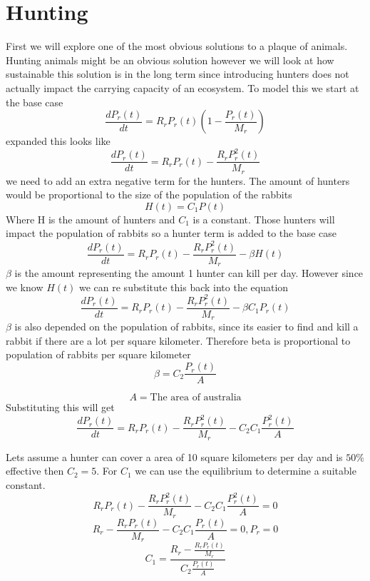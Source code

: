 \documentclass{article}
\begin{document}
\section{Hunting}
First we will explore one of the most obvious solutions to a plaque of animals. Hunting animals might be an obvious solution however we will look at how sustainable this solution is in the long term since introducing hunters does not actually impact the carrying capacity of an ecosystem. To model this we start at the base case 
$$
\frac{dP_r(t)}{dt} = R_rP_r(t)(1-\frac{P_r(t)}{M_r})
$$
expanded this looks like 
$$
\frac{dP_r(t)}{dt} = R_rP_r(t)-\frac{R_rP_r^2(t)}{M_r}
$$
we need to add an extra negative term for the hunters. The amount of hunters would be proportional to the size of the population of the rabbits
$$
H(t) = C_1 P(t)
$$
Where H is the amount of hunters and $C_1$ is a constant. Those hunters will impact the population of rabbits so a hunter term is added to the base case
$$
\frac{dP_r(t)}{dt} = R_rP_r(t)-\frac{R_rP_r^2(t)}{M_r} - \beta H(t)
$$
$\beta$ is the amount representing the amount 1 hunter can kill per day. However since we know $H(t)$ we can re substitute this back into the equation
$$
\frac{dP_r(t)}{dt} = R_rP_r(t)-\frac{R_rP_r^2(t)}{M_r} - \beta C_1 P_r(t)
$$
$\beta $ is also depended on the population of rabbits, since its easier to find and kill a rabbit if there are a lot per square kilometer. Therefore beta is proportional to population of rabbits per square kilometer
$$
\beta = C_2 \frac{P_r(t)}{A}
$$

$$A = \text{The area of australia}$$
Substituting this will get 
$$
\frac{dP_r(t)}{dt} = R_rP_r(t)-\frac{R_rP_r^2(t)}{M_r} - C_2 C_1 \frac{P_r^2(t)}{A}
$$

Lets assume a hunter can cover a area of 10 square kilometers per day and is $50\%$ effective then $C_2 = 5$. For  $C_1$ we can use the equilibrium to determine a suitable constant. 
$$R_rP_r(t)-\frac{R_rP_r^2(t)}{M_r} - C_2 C_1 \frac{P_r^2(t)}{A} = 0$$
$$ R_r-\frac{R_rP_r(t)}{M_r} - C_2 C_1 \frac{P_r(t)}{A} = 0, P_r = 0 $$
$$ C_1 = \frac{R_r-\frac{R_rP_r(t)}{M_r}}{C_2 \frac{P_r(t)}{A}} $$
\end{document}
